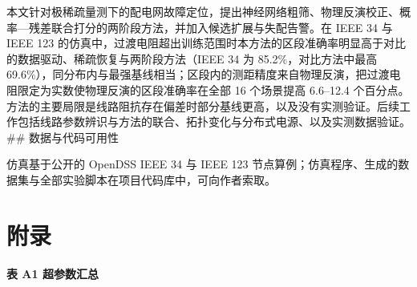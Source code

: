 \documentclass[
  11pt,
]{ctexart}
\begin{document}
本文针对极稀疏量测下的配电网故障定位，提出神经网络粗筛、物理反演校正、概率---残差联合打分的两阶段方法，并加入候选扩展与失配告警。在
IEEE 34 与 IEEE 123
的仿真中，过渡电阻超出训练范围时本方法的区段准确率明显高于对比的数据驱动、稀疏恢复与两阶段方法（IEEE
34 为 85.2\%，对比方法中最高
69.6\%），同分布内与最强基线相当；区段内的测距精度来自物理反演，把过渡电阻限定为实数使物理反演的区段准确率在全部
16 个场景提高 6.6--12.4
个百分点。方法的主要局限是线路阻抗存在偏差时部分基线更高，以及没有实测验证。后续工作包括线路参数辨识与方法的联合、拓扑变化与分布式电源、以及实测数据验证。
\#\# 数据与代码可用性

仿真基于公开的 OpenDSS IEEE 34 与 IEEE 123
节点算例；仿真程序、生成的数据集与全部实验脚本在项目代码库中，可向作者索取。

\hypertarget{ux9644ux5f55}{%
\section{附录}\label{ux9644ux5f55}}

\textbf{表 A1 超参数汇总}
\end{document}
